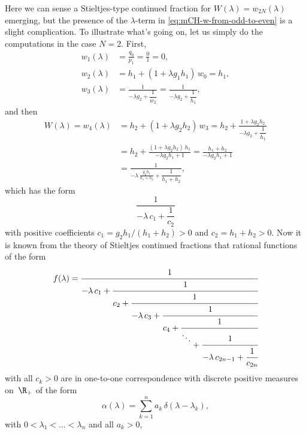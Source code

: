 \documentclass[10pt,a4paper]{article} \pdfoutput=1 
\begin{document}
Here we can sense a Stieltjes-type continued fraction for
$W(\lambda) = w_{2N}(\lambda)$ emerging, but the presence of
the $\lambda$-term in \eqref{eq:mCH-w-from-odd-to-even}
is a slight complication.
To illustrate what's going on, let us simply do the computations in the case $N=2$.
First,
\begin{equation*}
  \begin{aligned}
    w_1(\lambda) &= \frac{q_0}{p_1} = \frac{0}{1} = 0
    ,\\
    w_2(\lambda) &= h_1 + (1 + \lambda g_1 h_1) \, w_0 = h_1
    ,\\
    w_3(\lambda) &= \frac{1}{-\lambda g_2 + \dfrac{1}{w_2}}
    = \frac{1}{-\lambda g_2 + \dfrac{1}{h_1}}
    ,
  \end{aligned}
\end{equation*}
and then
\begin{equation*}
  \begin{split}
    W(\lambda)
    = w_4(\lambda)
    &
    = h_2 + (1 + \lambda g_2 h_2) \, w_3
    = h_2 + \frac{1 + \lambda g_2 h_2}{-\lambda g_2 + \dfrac{1}{h_1}}
    \\ &
    = h_2 + \frac{(1 + \lambda g_2 h_2) \, h_1}{-\lambda g_2 h_1 + 1}
    = \frac{h_1 + h_2}{-\lambda g_2 h_1 + 1}
    \\ &
    = \frac{1}{- \lambda \, \frac{g_2 h_1}{h_1 + h_2} + \dfrac{1}{h_1 + h_2}}
    ,
  \end{split}
\end{equation*}
which has the form
\begin{equation*}
  \frac{1}{- \lambda \, c_1 + \dfrac{1}{c_2}}
\end{equation*}
with positive coefficients $c_1 = g_2 h_1 / (h_1+h_2) > 0$ and $c_2 = h_1 + h_2 > 0$.
Now it is known from the theory of Stieltjes continued fractions
that rational functions of the form
\begin{equation*}
  f(\lambda) =
  \cfrac{1}{-\lambda \, c_1 +
    \cfrac{1}{c_2 +
      \cfrac{1}{- \lambda \, c_3 +
        \cfrac{1}{c_4 +
          \cfrac{1}{\raisebox{1.5ex}{$\ddots$} +
          \cfrac{1}{- \lambda \, c_{2n-1} +
            \cfrac{1}{c_{2n}}
          }}}}}}
\end{equation*}
with all $c_k>0$ are in one-to-one correspondence with discrete positive measures on~$\R_+$ of the form
\begin{equation}
  \label{eq:mCH-discrete-measure-on-R+}
  \alpha(\lambda) = \sum_{k=1}^n a_k \, \delta(\lambda - \lambda_k)
  ,
\end{equation}
with $0 < \lambda_1 < \dots < \lambda_n$ and all $a_k>0$,
\end{document}
